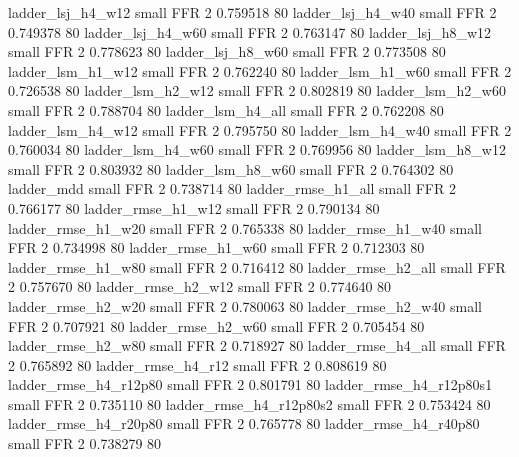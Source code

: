        ladder_lsj_h4_w12      small      FFR                 2 0.759518 80
       ladder_lsj_h4_w40      small      FFR                 2 0.749378 80
       ladder_lsj_h4_w60      small      FFR                 2 0.763147 80
       ladder_lsj_h8_w12      small      FFR                 2 0.778623 80
       ladder_lsj_h8_w60      small      FFR                 2 0.773508 80
       ladder_lsm_h1_w12      small      FFR                 2 0.762240 80
       ladder_lsm_h1_w60      small      FFR                 2 0.726538 80
       ladder_lsm_h2_w12      small      FFR                 2 0.802819 80
       ladder_lsm_h2_w60      small      FFR                 2 0.788704 80
       ladder_lsm_h4_all      small      FFR                 2 0.762208 80
       ladder_lsm_h4_w12      small      FFR                 2 0.795750 80
       ladder_lsm_h4_w40      small      FFR                 2 0.760034 80
       ladder_lsm_h4_w60      small      FFR                 2 0.769956 80
       ladder_lsm_h8_w12      small      FFR                 2 0.803932 80
       ladder_lsm_h8_w60      small      FFR                 2 0.764302 80
              ladder_mdd      small      FFR                 2 0.738714 80
      ladder_rmse_h1_all      small      FFR                 2 0.766177 80
      ladder_rmse_h1_w12      small      FFR                 2 0.790134 80
      ladder_rmse_h1_w20      small      FFR                 2 0.765338 80
      ladder_rmse_h1_w40      small      FFR                 2 0.734998 80
      ladder_rmse_h1_w60      small      FFR                 2 0.712303 80
      ladder_rmse_h1_w80      small      FFR                 2 0.716412 80
      ladder_rmse_h2_all      small      FFR                 2 0.757670 80
      ladder_rmse_h2_w12      small      FFR                 2 0.774640 80
      ladder_rmse_h2_w20      small      FFR                 2 0.780063 80
      ladder_rmse_h2_w40      small      FFR                 2 0.707921 80
      ladder_rmse_h2_w60      small      FFR                 2 0.705454 80
      ladder_rmse_h2_w80      small      FFR                 2 0.718927 80
      ladder_rmse_h4_all      small      FFR                 2 0.765892 80
      ladder_rmse_h4_r12      small      FFR                 2 0.808619 80
   ladder_rmse_h4_r12p80      small      FFR                 2 0.801791 80
 ladder_rmse_h4_r12p80s1      small      FFR                 2 0.735110 80
 ladder_rmse_h4_r12p80s2      small      FFR                 2 0.753424 80
   ladder_rmse_h4_r20p80      small      FFR                 2 0.765778 80
   ladder_rmse_h4_r40p80      small      FFR                 2 0.738279 80
